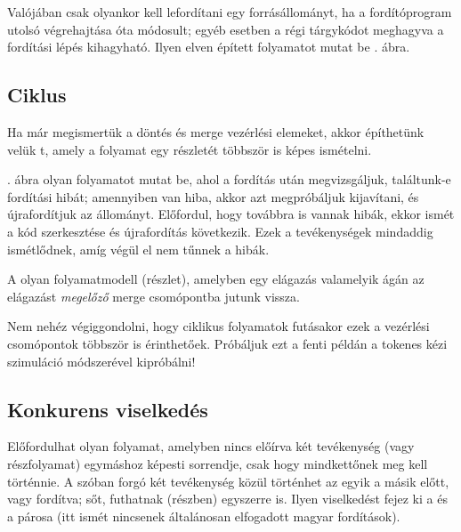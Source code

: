 \begin{pelda}
Valójában csak olyankor kell lefordítani egy forrásállományt, ha a fordítóprogram utolsó végrehajtása óta módosult; egyéb esetben a régi tárgykódot meghagyva a fordítási lépés kihagyható. Ilyen elven épített folyamatot mutat be . ábra.  
\end{pelda}



\subsection{Ciklus}
Ha már megismertük a döntés és merge vezérlési elemeket, akkor építhetünk velük t, amely a folyamat egy részletét többször is képes ismételni. 

\begin{pelda}
. ábra olyan folyamatot mutat be, ahol a fordítás után megvizsgáljuk, találtunk-e fordítási hibát; amennyiben van hiba, akkor azt megpróbáljuk kijavítani, és újrafordítjuk az állományt. Előfordul, hogy továbbra is vannak hibák, ekkor ismét a kód szerkesztése és újrafordítás következik. Ezek a tevékenységek mindaddig ismétlődnek, amíg végül el nem tűnnek a hibák.
\end{pelda}


\begin{definicio}
	A  olyan folyamatmodell (részlet), amelyben egy elágazás valamelyik ágán az elágazást \emph{megelőző} merge csomópontba jutunk vissza.
\end{definicio}

Nem nehéz végiggondolni, hogy ciklikus folyamatok futásakor ezek a vezérlési csomópontok többször is érinthetőek. Próbáljuk ezt a fenti példán a tokenes kézi szimuláció módszerével kipróbálni!

\subsection{Konkurens viselkedés}
Előfordulhat olyan folyamat, amelyben nincs előírva két tevékenység (vagy részfolyamat) egymáshoz képesti sorrendje, csak hogy mindkettőnek meg kell történnie. A szóban forgó két tevékenység közül történhet az egyik a másik előtt, vagy fordítva; sőt, futhatnak (részben) egyszerre is. Ilyen viselkedést fejez ki a  és a  párosa (itt ismét nincsenek általánosan elfogadott magyar fordítások).

